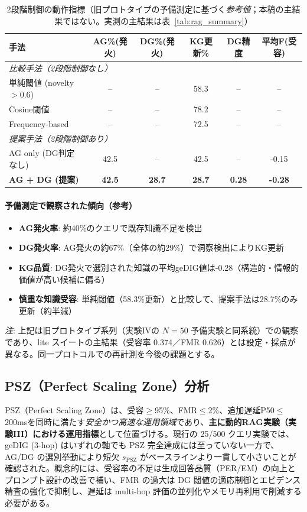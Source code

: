 \documentclass[ja=standard,xelatex]{bxjsarticle}
\begin{document}
\begin{table}[H]
\centering
\caption{2段階制御の動作指標（旧プロトタイプの予備測定に基づく\emph{参考値}；本稿の主結果ではない。実測の主結果は表~\ref{tab:rag_summary}）}
\label{tab:rag_two_stage_control}
\begin{tabular}{lccccc}
\toprule
手法 & AG\%(発火) & DG\%(発火) & KG更新\% & DG精度 & 平均F(受容) \\
\midrule
\multicolumn{6}{l}{\textit{比較手法（2段階制御なし）}} \\
単純閾値 (novelty$>$0.6) & -- & -- & 58.3 & -- & -- \\
Cosine閾値 & -- & -- & 78.2 & -- & -- \\
Frequency-based & -- & -- & 72.5 & -- & -- \\
\midrule
\multicolumn{6}{l}{\textit{提案手法（2段階制御あり）}} \\
AG only (DG判定なし) & 42.5 & -- & 42.5 & -- & -0.15 \\
\textbf{AG + DG (提案)} & \textbf{42.5} & \textbf{28.7} & \textbf{28.7} & \textbf{0.28} & \textbf{-0.28} \\
\bottomrule
\end{tabular}
\end{table}

\paragraph{予備測定で観察された傾向（参考）}
\begin{itemize}
  \item \textbf{AG発火率}: 約40\%のクエリで既存知識不足を検出
  \item \textbf{DG発火率}: AG発火の約67\%（全体の約29\%）で洞察検出によりKG更新
  \item \textbf{KG品質}: DG発火で選別された知識の平均geDIG値は-0.28（構造的・情報的価値が高い候補に偏る）
  \item \textbf{慎重な知識受容}: 単純閾値（58.3\%更新）と比較して、提案手法は28.7\%のみ更新（約半減）
\end{itemize}
\noindent\textit{注}: 上記は旧プロトタイプ系列（実験IVの $N{=}50$ 予備実験と同系統）での観察であり、lite スイートの主結果（受容率 0.374／FMR 0.626）とは設定・採点が異なる。同一プロトコルでの再計測を今後の課題とする。

\subsection{PSZ（Perfect Scaling Zone）分析}
PSZ（Perfect Scaling Zone）は、受容$\ge$95\%、FMR$\le$2\%、追加遅延P50$\le$200msを同時に満たす\emph{安全かつ高速な運用領域}であり、\textbf{主に動的RAG実験（実験III）における運用指標}として位置づける。現行の 25/500 クエリ実験では、geDIG (3-hop) はいずれの軸でも PSZ 完全達成には至っていない一方で、AG/DG の選別挙動により短欠 $s_{\mathrm{PSZ}}$ がベースラインより一貫して小さいことが確認された。概念的には、受容率の不足は生成回答品質（PER/EM）の向上とプロンプト設計の改善で補い、FMR の過大は DG 閾値の適応制御とエビデンス精査の強化で抑制し、遅延は multi-hop 評価の並列化やメモリ再利用で削減する必要がある。
\end{document}
